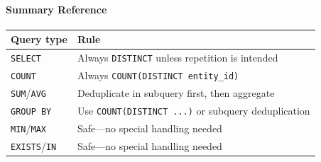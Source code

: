 \begin{tcolorbox}[
  colback=gray!5,
  colframe=gray!20,
  arc=4pt,
  boxrule=0.5pt,
  breakable,
  left=8pt,
  right=8pt,
  top=8pt,
  bottom=8pt,
  nobeforeafter,
]
\paragraph{Summary Reference}
\renewcommand{\arraystretch}{1.15}
\begin{tabular}{@{}ll@{}}
  \toprule
  \textbf{Query type} & \textbf{Rule} \\
  \midrule
  \texttt{SELECT}     & Always \texttt{DISTINCT} unless repetition is intended \\
  \texttt{COUNT}      & Always \texttt{COUNT(DISTINCT entity\_id)} \\
  \texttt{SUM}/\texttt{AVG} & Deduplicate in subquery first, then aggregate \\
  \texttt{GROUP BY}   & Use \texttt{COUNT(DISTINCT ...)} or subquery deduplication \\
  \texttt{MIN}/\texttt{MAX} & Safe---no special handling needed \\
  \texttt{EXISTS}/\texttt{IN} & Safe---no special handling needed \\
  \bottomrule
\end{tabular}

\end{tcolorbox}
